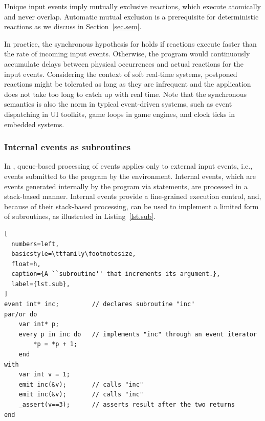 Unique input events imply mutually exclusive reactions, which execute
atomically and never overlap.
%
Automatic mutual exclusion is a prerequisite for deterministic reactions as
we discuss in Section~\ref{sec.sem}.
%

In practice, the synchronous hypothesis for \CEU holds if reactions execute
faster than the rate of incoming input events.
%
Otherwise, the program would continuously accumulate delays between physical
occurrences and actual reactions for the input events.
%
Considering the context of soft real-time systems,
postponed reactions might be tolerated as long as they are infrequent and the
application does not take too long to catch up with real time.
%
Note that the synchronous semantics is also the norm in typical event-driven
systems, such as event dispatching in UI toolkits, game loops in game engines,
and clock ticks in embedded systems.

\subsubsection*{Internal events as subroutines}

In \CEU, queue-based processing of events applies only to external input
events, i.e., events submitted to the program by the environment.
%
Internal events, which are events generated internally by the program via
 statements, are processed in a stack-based manner.
%
Internal events provide a fine-grained execution control, and, because of their
stack-based processing, can be used to implement a limited form of subroutines,
as illustrated in Listing~\ref{lst.sub}.

\begin{lstlisting}[
  numbers=left,
  basicstyle=\ttfamily\footnotesize,
  float=h,
  caption={A ``subroutine'' that increments its argument.},
  label={lst.sub},
]
event int* inc;         // declares subroutine "inc"
par/or do
    var int* p;
    every p in inc do   // implements "inc" through an event iterator
        *p = *p + 1;
    end
with
    var int v = 1;
    emit inc(&v);       // calls "inc"
    emit inc(&v);       // calls "inc"
    _assert(v==3);      // asserts result after the two returns
end
\end{lstlisting}

